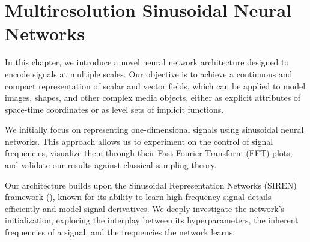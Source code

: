 \chapter{Multiresolution Sinusoidal Neural Networks}




In this chapter, we introduce a novel neural network architecture designed to encode signals at multiple scales. Our objective is to achieve a continuous and compact representation of scalar and vector fields, which can be applied to model images, shapes, and other complex media objects, either as explicit attributes of space-time coordinates or as level sets of implicit functions.

We initially focus on representing one-dimensional signals using sinusoidal neural networks. This approach allows us to experiment on the control of signal frequencies, visualize them through their Fast Fourier Transform (FFT) plots, and validate our results against classical sampling theory.

Our architecture builds upon the Sinusoidal Representation Networks (SIREN) framework (\cite{sitzmann2019siren}), known for its ability to learn high-frequency signal details efficiently and model signal derivatives. We deeply investigate the network's initialization, exploring the interplay between its hyperparameters, the inherent frequencies of a signal, and the frequencies the network learns.

